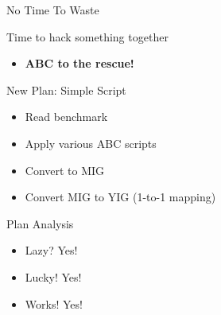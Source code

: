 \begin{frame}[t]{}
	\Huge No Time To Waste
	\normalsize
	\begin{block}{Time to hack something together}
		\begin{itemize}
			\item \textbf{ABC to the rescue!}
		\end{itemize}
	\end{block}
	\pause
	\begin{block}{New Plan: Simple Script}
		\begin{itemize}
			\item Read benchmark
			\item Apply various ABC scripts
			\item Convert to MIG
			\item Convert MIG to YIG (1-to-1 mapping)
		\end{itemize}
	\end{block}
	\pause
	\begin{block}{Plan Analysis}
		\begin{itemize}
			\item Lazy? Yes!
			\item Lucky! Yes!
			\item Works! Yes!
		\end{itemize}
	\end{block}
\end{frame}

